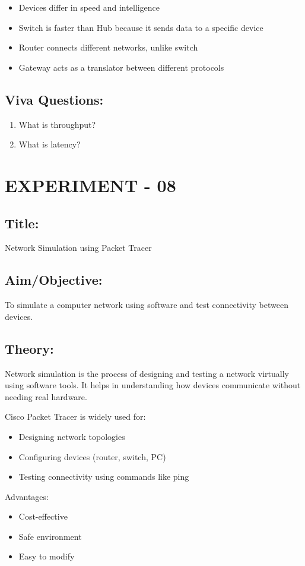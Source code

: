\documentclass[a4paper,10pt]{article}
\begin{document}
\begin{itemize}
    \item Devices differ in speed and intelligence
    \item Switch is faster than Hub because it sends data to a specific device
    \item Router connects different networks, unlike switch
    \item Gateway acts as a translator between different protocols
\end{itemize}

\subsection{Viva Questions:}
\begin{enumerate}
    \item What is throughput?
    \item What is latency?
\end{enumerate}

\newpage
\section{EXPERIMENT - 08}
\subsection{Title:}
Network Simulation using Packet Tracer

\subsection{Aim/Objective:}
To simulate a computer network using software and test connectivity between devices.

\subsection{Theory:}
Network simulation is the process of designing and testing a network virtually using software tools. It helps in understanding how devices communicate without needing real hardware.

Cisco Packet Tracer is widely used for:
\begin{itemize}
    \item Designing network topologies
    \item Configuring devices (router, switch, PC)
    \item Testing connectivity using commands like ping
\end{itemize}
Advantages:
\begin{itemize}
    \item Cost-effective
    \item Safe environment
    \item Easy to modify
\end{itemize}
    
\end{document}
